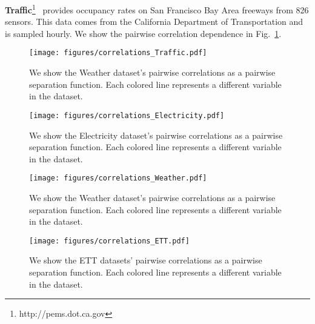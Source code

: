\hspace{1cm} \textbf{Traffic}\footnote{http://pems.dot.ca.gov}~\cite{wu2021autoformer} provides occupancy rates on San Francisco Bay Area freeways from 826 sensors. This data comes from the California Department of Transportation and is sampled hourly. We show the pairwise correlation dependence in Fig.~\ref{fig:Traffic_correlations}.


\begin{figure}[!htb]
    \centering
    \texttt{[image: figures/correlations\_Traffic.pdf]}
    \caption{We show the Weather dataset's pairwise correlations as a pairwise separation function. Each colored line represents a different variable in the dataset.}
    \label{fig:Traffic_correlations}
\end{figure}

\begin{figure}[!hb]
\begin{minipage}{.5\textwidth}
    \texttt{[image: figures/correlations\_Electricity.pdf]}
    \caption{We show the Electricity dataset's pairwise correlations as a pairwise separation function. Each colored line represents a different variable in the dataset.}
    \label{fig:Electricity_correlations}
\end{minipage}
\hfill    
\begin{minipage}{.5\textwidth}
    \texttt{[image: figures/correlations\_Weather.pdf]}
    \caption{We show the Weather dataset's pairwise correlations as a pairwise separation function. Each colored line represents a different variable in the dataset.}
    \label{fig:Weather_correlations}
\end{minipage}
\end{figure}

\begin{figure*}[!htb]
    \centering
    \texttt{[image: figures/correlations\_ETT.pdf]}
    \caption{We show the ETT datasets' pairwise correlations as a pairwise separation function. Each colored line represents a different variable in the dataset.}
    \label{fig:ETT_correlations}
\end{figure*}










